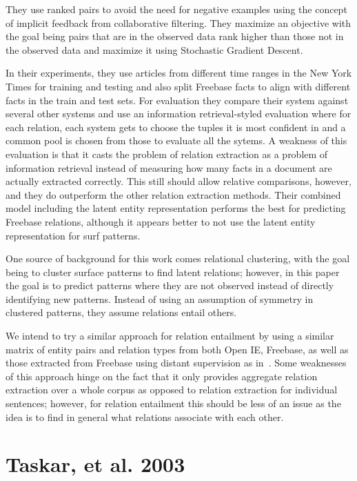 \documentclass{article}
\begin{document}
They use ranked pairs to avoid the need for negative examples using the concept of implicit feedback from collaborative filtering. They maximize an objective with the goal being pairs that are in the observed data rank higher than those not in the observed data and maximize it using Stochastic Gradient Descent.

In their experiments, they use articles from different time ranges in the New York Times for training and testing and also split Freebase facts to align with different facts in the train and test sets. For evaluation they compare their system against several other systems and use an information retrieval-styled evaluation where for each relation, each system gets to choose the tuples it is most confident in and a common pool is chosen from those to evaluate all the sytems. A weakness of this evaluation is that it casts the problem of relation extraction as a problem of information retrieval instead of measuring how many facts in a document are actually extracted correctly. This still should allow relative comparisons, however, and they do outperform the other relation extraction methods. Their combined model including the latent entity representation performs the best for predicting Freebase relations, although it appears better to not use the latent entity representation for surf patterns.

One source of background for this work comes relational clustering, with the goal being to cluster surface patterns to find latent relations; however, in this paper the goal is to predict patterns where they are not observed instead of directly identifying new patterns. Instead of using an assumption of symmetry in clustered patterns, they assume relations entail others.

We intend to try a similar approach for relation entailment by using a similar matrix of entity pairs and relation types from both Open IE, Freebase, as well as those extracted from Freebase using distant supervision as in~\cite{HoffmannZLZW11}. Some weaknesses of this approach hinge on the fact that it only provides aggregate relation extraction over a whole corpus as opposed to relation extraction for individual sentences; however, for relation entailment this should be less of an issue as the idea is to find in general what relations associate with each other.

\section*{Taskar, et al. 2003}
\end{document}
